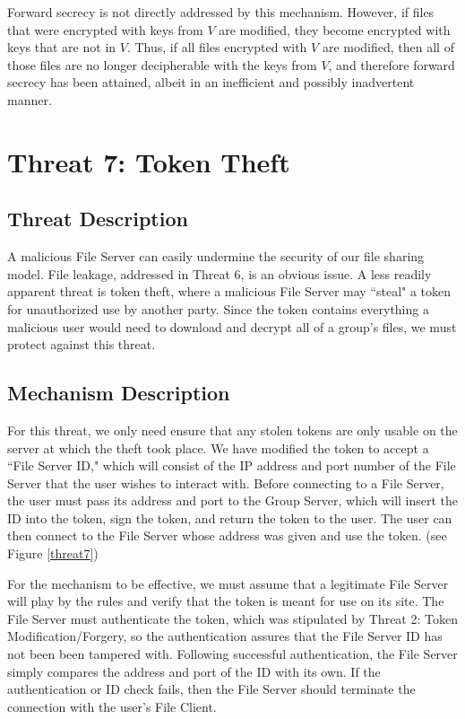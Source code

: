 \documentclass[11pt]{article}
\begin{document}
Forward secrecy is not directly addressed by this mechanism. However, if files that were encrypted with keys from $V$ are modified, they become encrypted with keys that are not in $V$. Thus, if all files encrypted with $V$ are modified, then all of those files are no longer decipherable with the keys from $V$, and therefore forward secrecy has been attained, albeit in an inefficient and possibly inadvertent
 manner.
\section{Threat 7: Token Theft}
\subsection{Threat Description}
A malicious File Server can easily undermine the security of our file sharing model. File leakage, addressed in Threat 6, is an obvious issue. A less readily apparent threat is token theft, where a malicious File Server may ``steal" a token for unauthorized use by another party. Since the token contains everything a malicious user would need to download and decrypt all of a group's files, we must protect against this threat.
\subsection{Mechanism Description}
For this threat, we only need ensure that any stolen tokens are only usable on the server at which the theft took place. We have modified the token to accept a ``File Server ID," which will consist of the IP address and port number of the File Server that the user wishes to interact with. Before connecting to a File Server, the user must pass its address and port to the Group Server, which will insert the ID into the token, sign the token, and return the token to the user. The user can then connect to the File Server whose address was given and use the token. (see Figure \ref{threat7})

For the mechanism to be effective, we must assume that a legitimate File Server will play by the rules and verify that the token is meant for use on its site. The File Server must authenticate the token, which was stipulated by Threat 2: Token Modification/Forgery, so the authentication assures that  the File Server ID has not been been tampered with. Following successful authentication, the File Server simply compares the address and port of the ID with its own. If the authentication or ID check fails, then the File Server should terminate the connection with the user's File Client.
\end{document}
